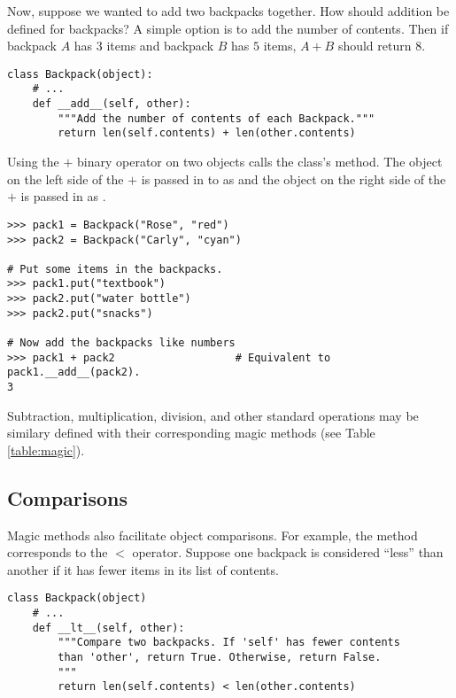 Now, suppose we wanted to add two backpacks together.
How should addition be defined for backpacks?
A simple option is to add the number of contents.
Then if backpack $A$ has $3$ items and backpack $B$ has $5$ items, $A + B$ should return $8$.

\begin{lstlisting}
class Backpack(object):
    # ...
    def __add__(self, other):
        """Add the number of contents of each Backpack."""
        return len(self.contents) + len(other.contents)
\end{lstlisting}

Using the $+$ binary operator on two  objects calls the class's  method.
The object on the left side of the $+$ is passed in to  as  and the object on the right side of the $+$ is passed in as .

\begin{lstlisting}
>>> pack1 = Backpack("Rose", "red")
>>> pack2 = Backpack("Carly", "cyan")

# Put some items in the backpacks.
>>> pack1.put("textbook")
>>> pack2.put("water bottle")
>>> pack2.put("snacks")

# Now add the backpacks like numbers
>>> pack1 + pack2                   # Equivalent to pack1.__add__(pack2).
3
\end{lstlisting}

Subtraction, multiplication, division, and other standard operations may be similary defined with their corresponding magic methods (see Table \ref{table:magic}).

\subsection*{Comparisons} %

Magic methods also facilitate object comparisons.
For example, the  method corresponds to the $<$ operator.
Suppose one backpack is considered ``less'' than another if it has fewer items in its list of contents.

\begin{lstlisting}
class Backpack(object)
    # ...
    def __lt__(self, other):
        """Compare two backpacks. If 'self' has fewer contents
        than 'other', return True. Otherwise, return False.
        """
        return len(self.contents) < len(other.contents)
\end{lstlisting}

